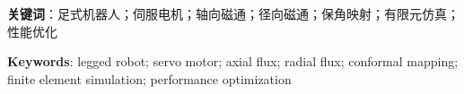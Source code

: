 \documentclass[\main/main.tex]{subfiles}
\begin{document}

\zhlipsum[1-2]

\textbf{关键词}：足式机器人；伺服电机；轴向磁通；径向磁通；保角映射；有限元仿真；性能优化

\blankpage


\lipsum[1-2]

\textbf{Keywords}: legged robot; servo motor; axial flux; radial flux; conformal mapping; finite element simulation; performance optimization


\blankpage
\end{document}
